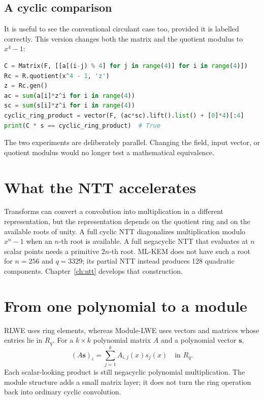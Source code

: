 \subsection{A cyclic comparison}

It is useful to see the conventional circulant case too, provided it is labelled correctly. This version changes both the matrix and the quotient modulus to $x^4-1$:

\begin{lstlisting}[language=Python]
C = Matrix(F, [[a[(i-j) % 4] for j in range(4)] for i in range(4)])
Rc = R.quotient(x^4 - 1, 'z')
z = Rc.gen()
ac = sum(a[i]*z^i for i in range(4))
sc = sum(s[i]*z^i for i in range(4))
cyclic_ring_product = vector(F, (ac*sc).lift().list() + [0]*4)[:4]
print(C * s == cyclic_ring_product)  # True
\end{lstlisting}

The two experiments are deliberately parallel. Changing the field, input vector, or quotient modulus would no longer test a mathematical equivalence.

\section{What the NTT accelerates}

Transforms can convert a convolution into multiplication in a different representation, but the representation depends on the quotient ring and on the available roots of unity. A full cyclic NTT diagonalizes multiplication modulo $x^n-1$ when an $n$-th root is available. A full negacyclic NTT that evaluates at $n$ scalar points needs a primitive $2n$-th root. ML-KEM does not have such a root for $n=256$ and $q=3329$; its partial NTT instead produces 128 quadratic components. Chapter~\ref{ch:ntt} develops that construction.

\section{From one polynomial to a module}

RLWE uses ring elements, whereas Module-LWE uses vectors and matrices whose entries lie in $R_q$. For a $k\times k$ polynomial matrix $A$ and a polynomial vector $\mathbf{s}$,
\[
(A\mathbf{s})_i=\sum_{j=1}^{k}A_{i,j}(x)s_j(x)\quad\text{in }R_q.
\]
Each scalar-looking product is still negacyclic polynomial multiplication. The module structure adds a small matrix layer; it does not turn the ring operation back into ordinary cyclic convolution.

